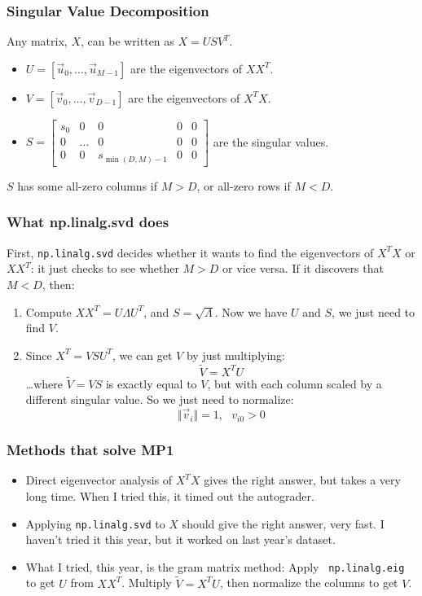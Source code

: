\documentclass{beamer}
\begin{document}
\begin{frame}
  \frametitle{Singular Value Decomposition}
  Any matrix, $X$, can be written as $X=USV^T$.
  \begin{itemize}
  \item $U=[\vec{u}_0,\ldots,\vec{u}_{M-1}]$ are the eigenvectors of $XX^T$.
  \item $V=[\vec{v}_0,\ldots,\vec{v}_{D-1}]$ are the eigenvectors of $X^TX$.
  \item $S=\left[\begin{array}{ccccc}s_0&0&0&0&0\\0&\ldots&0&0&0\\0&0&s_{\min(D,M)-1}&0&0\end{array}\right]$ are the singular values.
  \end{itemize}
  $S$ has some all-zero columns if $M>D$, or all-zero rows if $M<D$.
\end{frame}

\begin{frame}
  \frametitle{What np.linalg.svd does}
  First, {\tt np.linalg.svd} decides whether it wants to find the eigenvectors of
  $X^TX$ or $XX^T$: it just checks to see whether $M>D$ or vice versa.
  If it discovers that $M<D$, then:
  \begin{enumerate}
  \item Compute  $XX^T=U\Lambda U^T$, and $S=\sqrt{\Lambda}$.
    Now we have $U$ and $S$, we just need to  find $V$.
  \item Since $X^T=VSU^T$, we can get $V$ by just multiplying:
    \[
    \tilde{V} = X^TU
    \]
    \ldots where $\tilde{V}=VS$ is exactly equal to $V$, but with each column
    scaled by a different singular value.  So we just need to normalize:
    \[
    \Vert\vec{v}_i\Vert=1,~~~v_{i0}>0
    \]
  \end{enumerate}
\end{frame}

\begin{frame}
  \frametitle{Methods that solve MP1}
  \begin{itemize}
  \item Direct eigenvector analysis of $X^TX$ gives the right answer, but
    takes a very long time. When I tried this, it timed out the autograder.
  \item Applying {\tt np.linalg.svd} to $X$ should give the right answer, very fast.
    I haven't tried it this year, but it worked on last year's dataset.
  \item What I tried, this year, is the gram matrix method: Apply {\tt
    np.linalg.eig} to get $U$ from $XX^T$. Multiply $\tilde{V}=X^TU$,
    then normalize the columns to get $V$.
  \end{itemize}
\end{frame}
\end{document}
